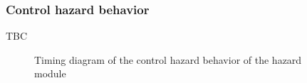     \subsubsection{Control hazard behavior}

      \begin{content}
          TBC
        \end{content}

      \begin{figure}[H]
          \centering
          
          \caption{Timing diagram of the control hazard behavior of the hazard module}
          \label{fig:hzdm-behavior-control-hazard}
        \end{figure}

\newpage
